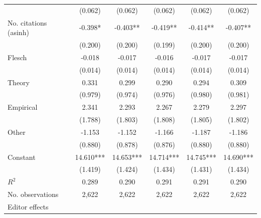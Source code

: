 \begin{table}[H]
\begin{threeparttable}
\begin{tabular}{p{4cm}SSSSS}
                                          &     (0.062)   &     (0.062)   &     (0.062)   &     (0.062)   &     (0.062)   \\
            No. citations (asinh)         &      -0.398*  &      -0.403** &      -0.419** &      -0.414** &      -0.407** \\
                                          &     (0.200)   &     (0.200)   &     (0.199)   &     (0.200)   &     (0.200)   \\
            Flesch                        &      -0.018   &      -0.017   &      -0.016   &      -0.017   &      -0.017   \\
                                          &     (0.014)   &     (0.014)   &     (0.014)   &     (0.014)   &     (0.014)   \\
            Theory                        &       0.331   &       0.299   &       0.290   &       0.294   &       0.309   \\
                                          &     (0.979)   &     (0.974)   &     (0.976)   &     (0.980)   &     (0.981)   \\
            Empirical                     &       2.341   &       2.293   &       2.267   &       2.279   &       2.297   \\
                                          &     (1.788)   &     (1.803)   &     (1.808)   &     (1.805)   &     (1.802)   \\
            Other                         &      -1.153   &      -1.152   &      -1.166   &      -1.187   &      -1.186   \\
                                          &     (0.880)   &     (0.878)   &     (0.876)   &     (0.880)   &     (0.880)   \\
            Constant                      &      14.610***&      14.653***&      14.714***&      14.745***&      14.690***\\
                                          &     (1.419)   &     (1.424)   &     (1.434)   &     (1.431)   &     (1.434)   \\
            \midrule
            \(R^2\)                       &       0.289   &       0.290   &       0.291   &       0.291   &       0.290   \\
            No. observations              &       2,622   &       2,622   &       2,622   &       2,622   &       2,622   \\
            \midrule
Editor effects        &           {}   &           {}   &           {}   &           {}   &           {}   \\

\end{tabular}
\end{threeparttable}
\end{table}
